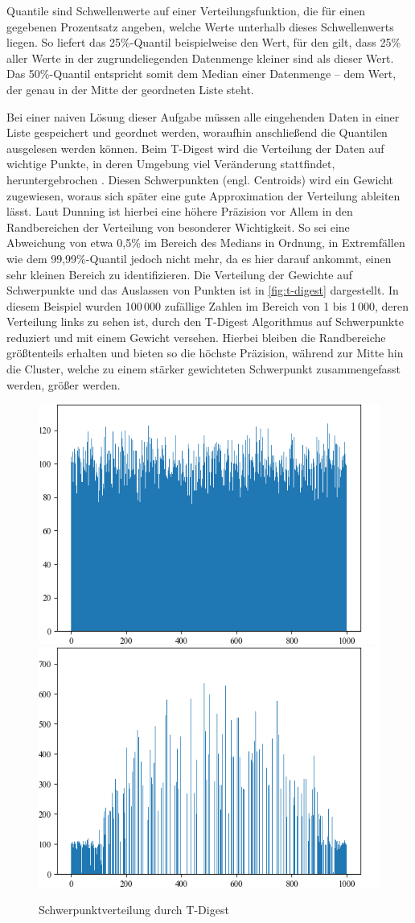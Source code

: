 Quantile sind Schwellenwerte auf einer Verteilungsfunktion, die für einen gegebenen Prozentsatz angeben, welche Werte unterhalb dieses Schwellenwerts liegen.
So liefert das 25\%-Quantil beispielweise den Wert, für den gilt, dass 25\% aller Werte in der zugrundeliegenden Datenmenge kleiner sind als dieser Wert.
Das 50\%-Quantil entspricht somit dem Median einer Datenmenge -- dem Wert, der genau in der Mitte der geordneten Liste steht.

Bei einer naiven Lösung dieser Aufgabe müssen alle eingehenden Daten in einer Liste gespeichert und geordnet werden, woraufhin anschließend die Quantilen ausgelesen werden können.
Beim T-Digest wird die Verteilung der Daten auf wichtige Punkte, in deren Umgebung viel Veränderung stattfindet, heruntergebrochen \cite{davidsonpilon2015}.
Diesen Schwerpunkten (engl. Centroids) wird ein Gewicht zugewiesen, woraus sich später eine gute Approximation der Verteilung ableiten lässt.
Laut Dunning \cite{dunning2015} ist hierbei eine höhere Präzision vor Allem in den Randbereichen der Verteilung von besonderer Wichtigkeit.
So sei eine Abweichung von etwa 0,5\% im Bereich des Medians in Ordnung, in Extremfällen wie dem 99,99\%-Quantil jedoch nicht mehr, da es hier darauf ankommt, einen sehr kleinen Bereich zu identifizieren.
Die Verteilung der Gewichte auf Schwerpunkte und das Auslassen von Punkten ist in \autoref{fig:t-digest} dargestellt.
In diesem Beispiel wurden 100\,000 zufällige Zahlen im Bereich von 1 bis 1\,000, deren Verteilung links zu sehen ist, durch den T-Digest Algorithmus auf Schwerpunkte reduziert und mit einem Gewicht versehen.
Hierbei bleiben die Randbereiche größtenteils erhalten und bieten so die höchste Präzision, während zur Mitte hin die Cluster, welche zu einem stärker gewichteten Schwerpunkt zusammengefasst werden, größer werden.

\begin{figure}[b]
	\centering
	\includegraphics[width=.49\linewidth]{images/t_digest_data.png}
	\includegraphics[width=.49\linewidth]{images/t_digest_sorted.png}
	\caption{Schwerpunktverteilung durch T-Digest}
	\label{fig:t-digest}
\end{figure}

